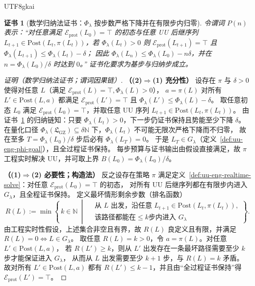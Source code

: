 \documentclass[12pt]{article}
\newtheorem{Certificate}{证书}[section]
\newcommand{\NN}{\mathbb{N}}
\newcommand{\GZLS}{\ensuremath{\mathfrak{L}_{\mathrm{GZ}}}}
\begin{document}
\begin{CJK*}{UTF8}{gkai}
\begin{Certificate}[数学归纳法证书：$\Phi_\lambda$ 按步数严格下降并在有限步内归零]
\label{cert:uu-eng-iff}
令谓词 $P(n)$ 表示：“对任意满足 $\mathcal{E}_{\mathrm{prot}}(L_0)=\top$ 的初态与任意 UU 后继序列
$L_{t+1}\in \mathrm{Post}(L_t,\pi(L_t))$，若 $\Phi_\lambda(L_t)>0$ 则
$\mathcal{E}_{\mathrm{prot}}(L_{t+1})=\top$ 且 $\Phi_\lambda(L_{t+1})\le \Phi_\lambda(L_t)-\delta$；
因此 $\Phi_\lambda(L_n)\le \Phi_\lambda(L_0)-n\delta$，并在 $n=\Phi_\lambda(L_0)/\delta$ 时达到 $0$。”
证书化要求为基步与归纳步成立。
\end{Certificate}

\begin{proof}[证明（数学归纳法证书；谓词因果链）]
\textbf{（(2)$\Rightarrow$(1) 充分性）}
设存在 $\pi$ 与 $\delta>0$ 使得对任意 $L$（满足 $\mathcal{E}_{\mathrm{prot}}(L)=\top,\Phi_\lambda(L)>0$），
$a=\pi(L)$ 对所有 $L'\in\mathrm{Post}(L,a)$ 都满足
$\mathcal{E}_{\mathrm{prot}}(L')=\top$ 且 $\Phi_\lambda(L')\le \Phi_\lambda(L)-\delta$。
取任意初态 $L_0$ 满足 $\mathcal{E}_{\mathrm{prot}}(L_0)=\top$，并取任意 UU 序列 $L_{t+1}\in\mathrm{Post}(L_t,\pi(L_t))$。
由证书~\ref{cert:uu-eng-iff} 的归纳链知：只要 $\Phi_\lambda(L_t)>0$，下一步仍证书保持且势能至少下降 $\delta$。
在量化口径 $\Phi_\lambda(\GZLS)\subseteq \delta\NN$ 下，$\Phi_\lambda(L_t)$ 不可能无限次严格下降而不归零，
故在至多 $T=\Phi_\lambda(L_0)/\delta$ 步后必有 $\Phi_\lambda(L_T)=0$。
于是 $L_T\in G_\lambda$（定义~\ref{def:uu-eng-phi-goal}），且全过程证书保持。
每步预算与证书输出由假设直接满足，故 $\pi$ 工程实时解决 UU，并可取上界 $B(L_0)=\Phi_\lambda(L_0)/\delta$。

\textbf{（(1)$\Rightarrow$(2) 必要性；构造法）}
反之设存在策略 $\pi$ 满足定义~\ref{def:uu-eng-realtime-solve}：对任意 $\mathcal{E}_{\mathrm{prot}}(L_0)=\top$ 的初态，
对所有 UU 后继序列都在有限步内进入 $G_\lambda$，且全程证书保持。
定义最坏情形剩余步数（排名函数）
\[
  R(L):=\min\left\{\,k\in\NN\ \middle|\
  \begin{aligned}
    &\text{从 }L\text{ 出发，沿任意 }L_{t+1}\in\mathrm{Post}(L_t,\pi(L_t)),\\
    &\text{该路径都能在}\le k\text{步内进入 }G_\lambda
  \end{aligned}
  \right\}.
\]
由工程实时性假设，上述集合非空且有界，故 $R(L)$ 良定义且有限，并满足
$R(L)=0\Longleftrightarrow L\in G_\lambda$。
取任意 $R(L)=k>0$，令 $a=\pi(L)$。对任意 $L'\in\mathrm{Post}(L,a)$，
若 $R(L')\ge k$，则从 $L'$ 出发存在一条最坏路径需要至少 $k$ 步才能保证进入 $G_\lambda$，
从而从 $L$ 出发需要至少 $k+1$ 步，与 $R(L)=k$ 矛盾。
故对所有 $L'\in\mathrm{Post}(L,a)$ 都有 $R(L')\le k-1$，并且由“全过程证书保持”得 $\mathcal{E}_{\mathrm{prot}}(L')=\top$。


\end{proof}
\end{CJK*}
\end{document}
